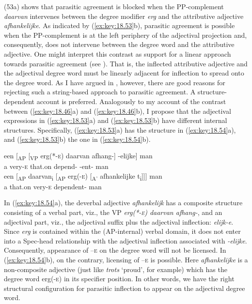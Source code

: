 \documentclass[output=paper]{langsci/langscibook}
\begin{document}
(53a) shows that parasitic agreement is blocked when the PP-complement
\emph{daarvan} intervenes between the degree modifier \emph{erg} and the
attributive adjective \emph{afhankelijke}. As indicated by (\ref{ex:key:18.53}b),
parasitic agreement is possible when the PP-complement is at the left periphery
of the adjectival projection and, consequently, does not intervene between the
degree word and the attributive adjective. One might interpret this contrast as
support for a linear approach towards parasitic agreement (see
). That is, the inflected attributive adjective and the
adjectival degree word must be linearly adjacent for inflection to spread onto
the degree word. As I have argued in , however, there are
good reasons for rejecting such a string-based approach to parasitic agreement.
A structure-dependent account is preferred. Analogously to my account of the
contrast between (\ref{ex:key:18.46}a) and (\ref{ex:key:18.46}b), I propose that the
adjectival expressions in (\ref{ex:key:18.53}a) and (\ref{ex:key:18.53}b) have different
internal structures. Specifically, (\ref{ex:key:18.53}a) has the structure in
(\ref{ex:key:18.54}a), and (\ref{ex:key:18.53}b) the one in (\ref{ex:key:18.54}b).

\ea%
    \label{ex:key:18.54}
	\ea
	\gll een [\textsubscript{AP} [\textsubscript{VP} erg(*-\textsc{e}) daarvan afhang-] -elijke] man\\
        a {} {} very-\textsc{e} that.on depend- -ent-\Agr{} man\\
	\ex
	\gll een [\textsubscript{AP} daarvan\textsubscript{i} [\textsubscript{AP} erg(-\textsc{e}) [\textsubscript{A'} afhankelijke t\textsubscript{i}]]] man\\
        a {} that.on {} very-\textsc{e} {} dependent-\Agr{} man\\
	\z
\z

In (\ref{ex:key:18.54}a), the deverbal adjective \emph{afhankelijk} has a composite
structure consisting of a verbal part, viz., the VP \emph{erg(*-\textsc{e})
daarvan afhang-}, and an adjectival part, viz., the adjectival suffix plus the
adjectival inflection: \emph{elijk-e}. Since \emph{erg} is contained within the
(AP-internal) verbal domain, it does not enter into a Spec-head relationship
with the adjectival inflection associated with \emph{-elijke}. Consequently,
appearance of –\textsc{e} on the degree word will not be licensed. In
(\ref{ex:key:18.54}b), on the contrary, licensing of –\textsc{e} is possible. Here
\emph{afhankelijke} is a non-composite adjective (just like \emph{trots}
‘proud’, for example) which has the degree word erg(-\textsc{e)} in its
specifier position. In other words, we have the right structural configuration
for parasitic inflection to appear on the adjectival degree word.
\end{document}
